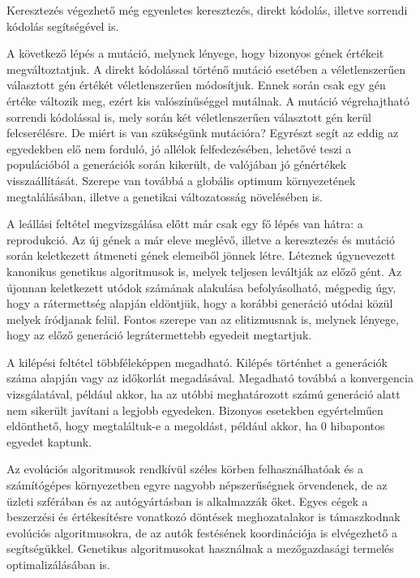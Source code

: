 \documentclass[12ppt,a4paper,oneside]{report}
\begin{document}


Keresztezés végezhető még egyenletes keresztezés, direkt kódolás, illetve sorrendi kódolás segítségével is.

A következő lépés a mutáció, melynek lényege, hogy bizonyos gének értékeit megváltoztatjuk. A direkt kódolással történő mutáció esetében a véletlenszerűen választott gén értékét véletlenszerűen módosítjuk. Ennek során csak egy gén értéke változik meg, ezért kis valószínűséggel mutálnak. A mutáció végrehajtható sorrendi kódolással is, mely során két véletlenszerűen választott gén kerül felcserélésre. De miért is van szükségünk mutációra? Egyrészt segít az eddig az egyedekben elő nem forduló, jó allélok felfedezésében, lehetővé teszi a populációból a generációk során kikerült, de valójában jó génértékek visszaállítását. Szerepe van továbbá a globális optimum környezetének megtalálásában, illetve a genetikai változatosság növelésében is.

A leállási feltétel megvizsgálása előtt már csak egy fő lépés van hátra: a reprodukció. Az új gének a már eleve meglévő, illetve a keresztezés és mutáció során keletkezett átmeneti gének elemeiből jönnek létre. Léteznek úgynevezett kanonikus genetikus algoritmusok is, melyek teljesen leváltják az előző gént. Az újonnan keletkezett utódok számának alakulása befolyásolható, mégpedig úgy, hogy a rátermettség alapján eldöntjük, hogy a korábbi generáció utódai közül melyek íródjanak felül. Fontos szerepe van az elitizmusnak is, melynek lényege, hogy az előző generáció legrátermettebb egyedeit megtartjuk.

A kilépési feltétel többféleképpen megadható. Kilépés történhet a generációk száma alapján vagy az időkorlát megadásával. Megadható továbbá a konvergencia vizsgálatával, például akkor, ha az utóbbi meghatározott számú generáció alatt nem sikerült javítani a legjobb egyedeken. Bizonyos esetekben egyértelműen eldönthető, hogy megtaláltuk-e a megoldást, például akkor, ha 0 hibapontos egyedet kaptunk.

Az evolúciós algoritmusok rendkívül széles körben felhasználhatóak és a számítógépes környezetben egyre nagyobb népszerűségnek örvendenek, de az üzleti szférában és az autógyártásban is alkalmazzák őket. Egyes cégek a beszerzési és értékesítésre vonatkozó döntések meghozatalakor is támaszkodnak evolúciós algoritmusokra, de az autók festésének koordinációja is elvégezhető a segítségükkel. Genetikus algoritmusokat használnak a mezőgazdasági termelés optimalizálásában is.
\end{document}
